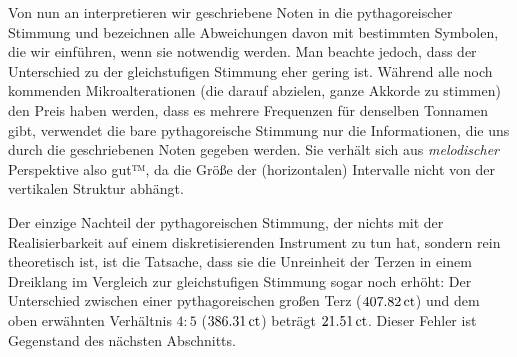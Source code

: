 \documentclass[ngerman,11pt]{scrartcl}
\begin{document}
Von nun an interpretieren wir geschriebene Noten in die pythagoreischer
Stimmung und bezeichnen alle Abweichungen davon mit bestimmten Symbolen, die
wir einführen, wenn sie notwendig werden. Man beachte jedoch, dass der
Unterschied zu der gleichstufigen Stimmung eher gering ist.
Während alle noch kommenden Mikroalterationen (die darauf abzielen, ganze
Akkorde zu stimmen) den Preis haben werden, dass es mehrere Frequenzen für
denselben Tonnamen gibt, verwendet die bare pythagoreische Stimmung nur die
Informationen, die uns durch die geschriebenen Noten gegeben werden. Sie verhält
sich aus \emph{melodischer} Perspektive also gut™, da die Größe der 
(horizontalen) Intervalle nicht von der vertikalen Struktur abhängt.

Der einzige Nachteil der pythagoreischen Stimmung, der nichts mit der Realisierbarkeit auf einem diskretisierenden Instrument zu tun hat, sondern rein theoretisch ist, ist die Tatsache, dass sie die Unreinheit der Terzen in einem Dreiklang im Vergleich zur gleichstufigen Stimmung sogar noch erhöht: Der Unterschied zwischen einer pythagoreischen großen Terz ($407.82\,\mathrm{ct}$) und dem oben erwähnten Verhältnis $4:5$ ($386.31\,\mathrm{ct}$) beträgt $21.51\,\mathrm{ct}$. Dieser Fehler ist Gegenstand des nächsten Abschnitts.

\end{document}
